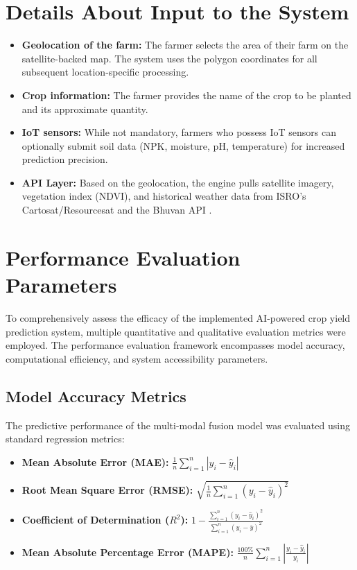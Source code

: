 
\section{Details About Input to the System}
\begin{itemize}
    \item \textbf{Geolocation of the farm:} The farmer selects the area of their farm on the satellite-backed map. The system uses the polygon coordinates for all subsequent location-specific processing.
    \item \textbf{Crop information:} The farmer provides the name of the crop to be planted and its approximate quantity.
    \item \textbf{IoT sensors:} While not mandatory, farmers who possess IoT sensors can optionally submit soil data (NPK, moisture, pH, temperature) for increased prediction precision.
    \item \textbf{API Layer:} Based on the geolocation, the engine pulls satellite imagery, vegetation index (NDVI), and historical weather data from ISRO's Cartosat/Resourcesat and the Bhuvan API \cite{isro2023bhuvan}.
\end{itemize}

\section*{Performance Evaluation Parameters}
\label{sec:performance-evaluation}

To comprehensively assess the efficacy of the implemented AI-powered crop yield prediction system, multiple quantitative and qualitative evaluation metrics were employed. The performance evaluation framework encompasses model accuracy, computational efficiency, and system accessibility parameters.

\subsection*{Model Accuracy Metrics}
The predictive performance of the multi-modal fusion model was evaluated using standard regression metrics:
\begin{itemize}
    \item \textbf{Mean Absolute Error (MAE):} $\frac{1}{n}\sum_{i=1}^{n}|y_i - \hat{y}_i|$
    \item \textbf{Root Mean Square Error (RMSE):} $\sqrt{\frac{1}{n}\sum_{i=1}^{n}(y_i - \hat{y}_i)^2}$
    \item \textbf{Coefficient of Determination ($R^2$):} $1 - \frac{\sum_{i=1}^{n}(y_i - \hat{y}_i)^2}{\sum_{i=1}^{n}(y_i - \bar{y})^2}$
    \item \textbf{Mean Absolute Percentage Error (MAPE):} $\frac{100\%}{n}\sum_{i=1}^{n}\left|\frac{y_i - \hat{y}_i}{y_i}\right|$
\end{itemize}

